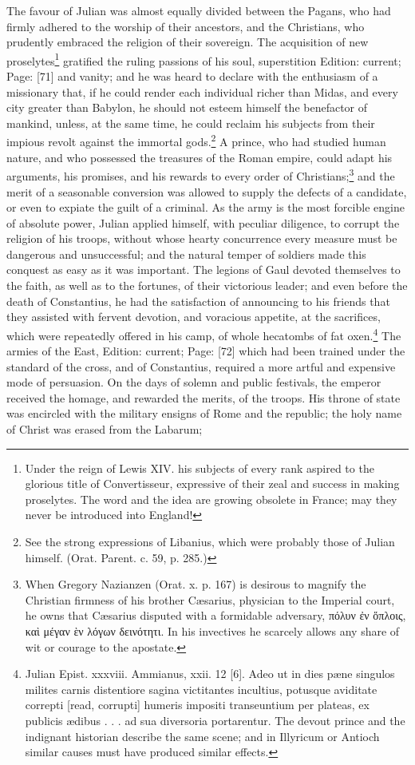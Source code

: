 The favour of Julian was almost equally divided between the Pagans, who had firmly adhered to the worship of their ancestors, and the Christians, who prudently embraced the religion of their sovereign. The acquisition of new proselytes\footnote{Under the reign of Lewis XIV. his subjects of every rank aspired to the glorious title of Convertisseur, expressive of their zeal and success in making proselytes. The word and the idea are growing obsolete in France; may they never be introduced into England!} gratified the ruling passions of his soul, superstition Edition: current; Page: [71] and vanity; and he was heard to declare with the enthusiasm of a missionary that, if he could render each individual richer than Midas, and every city greater than Babylon, he should not esteem himself the benefactor of mankind, unless, at the same time, he could reclaim his subjects from their impious revolt against the immortal gods.\footnote{See the strong expressions of Libanius, which were probably those of Julian himself. (Orat. Parent. c. 59, p. 285.)} A prince, who had studied human nature, and who possessed the treasures of the Roman empire, could adapt his arguments, his promises, and his rewards to every order of Christians;\footnote{When Gregory Nazianzen (Orat. x. p. 167) is desirous to magnify the Christian firmness of his brother Cæsarius, physician to the Imperial court, he owns that Cæsarius disputed with a formidable adversary, \textgreek{πόλυν \texthebrew{ἐ}ν \texthebrew{ὅ}πλοις, κα\texthebrew{ὶ} μέγαν \texthebrew{ὲ}ν λόγων δεινότητι}. In his invectives he scarcely allows any share of wit or courage to the apostate.} and the merit of a seasonable conversion was allowed to supply the defects of a candidate, or even to expiate the guilt of a criminal. As the army is the most forcible engine of absolute power, Julian applied himself, with peculiar diligence, to corrupt the religion of his troops, without whose hearty concurrence every measure must be dangerous and unsuccessful; and the natural temper of soldiers made this conquest as easy as it was important. The legions of Gaul devoted themselves to the faith, as well as to the fortunes, of their victorious leader; and even before the death of Constantius, he had the satisfaction of announcing to his friends that they assisted with fervent devotion, and voracious appetite, at the sacrifices, which were repeatedly offered in his camp, of whole hecatombs of fat oxen.\footnote{Julian Epist. xxxviii. Ammianus, xxii. 12 [6]. Adeo ut in dies pæne singulos milites carnis distentiore sagina victitantes incultius, potusque aviditate correpti [read, corrupti] humeris impositi transeuntium per plateas, ex publicis ædibus . . . ad sua diversoria portarentur. The devout prince and the indignant historian describe the same scene; and in Illyricum or Antioch similar causes must have produced similar effects.} The armies of the East, Edition: current; Page: [72] which had been trained under the standard of the cross, and of Constantius, required a more artful and expensive mode of persuasion. On the days of solemn and public festivals, the emperor received the homage, and rewarded the merits, of the troops. His throne of state was encircled with the military ensigns of Rome and the republic; the holy name of Christ was erased from the Labarum; 